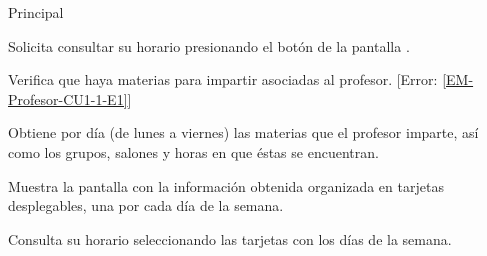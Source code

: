 \begin{UCtrayectoria}{Principal}
	
	\UCpaso [\UCactor] Solicita consultar su horario presionando el botón  de la pantalla .

	\UCpaso Verifica que haya materias para impartir asociadas al profesor. [Error: \ref{EM-Profesor-CU1-1-E1}]

	\UCpaso Obtiene por día (de lunes a viernes) las materias que el profesor imparte, así como los grupos, salones y horas en que éstas se encuentran. 

	\UCpaso Muestra la pantalla  con la información obtenida organizada en tarjetas desplegables, una por cada día de la semana.

	\UCpaso[\UCactor] Consulta su horario seleccionando las tarjetas con los días de la semana.

\end{UCtrayectoria}
